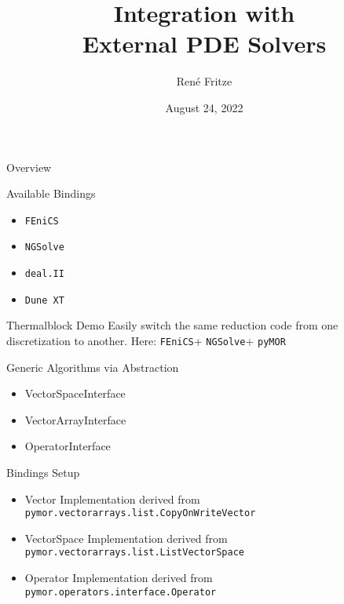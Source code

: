 \documentclass[%
  10pt,
  compress,
  table,
]{beamer}
\title{\Huge Integration with \\External PDE Solvers}
\author{René Fritze}
\date{August 24, 2022}
\newcommand{\mycode}[1]{\textnormal{\texttt{#1}}}
\newcommand{\fenics}{\mycode{FEniCS}}
\newcommand{\ngsolve}{\mycode{NGSolve}}
\newcommand{\deal}{\mycode{deal.II}}
\newcommand{\dunext}{\mycode{Dune XT}}
\newcommand{\pymor}{\mycode{pyMOR}}
\begin{document}
\maketitle

\begin{frame}{Overview}

\end{frame}

\begin{frame}{Available Bindings}
  \begin{itemize}
    \item \fenics
    \item \ngsolve
    \item \deal
    \item \dunext
  \end{itemize}
\end{frame}

\begin{frame}{Thermalblock Demo}
Easily switch the same reduction code from one discretization to
another. Here: \fenics + \ngsolve + \pymor 
\end{frame}

\begin{frame}[fragile]{Generic Algorithms via Abstraction}
\begin{itemize}
  \item VectorSpaceInterface
  \item VectorArrayInterface
  \item OperatorInterface
\end{itemize}
\end{frame}

\begin{frame}[fragile]{Bindings Setup}
\begin{itemize}
\item Vector Implementation derived from
\texttt{pymor.vectorarrays.list.CopyOnWriteVector}
\item VectorSpace Implementation derived from
\texttt{pymor.vectorarrays.list.ListVectorSpace}
\item Operator Implementation derived from
\texttt{pymor.operators.interface.Operator}
\end{itemize}
\end{frame}
\end{document}
